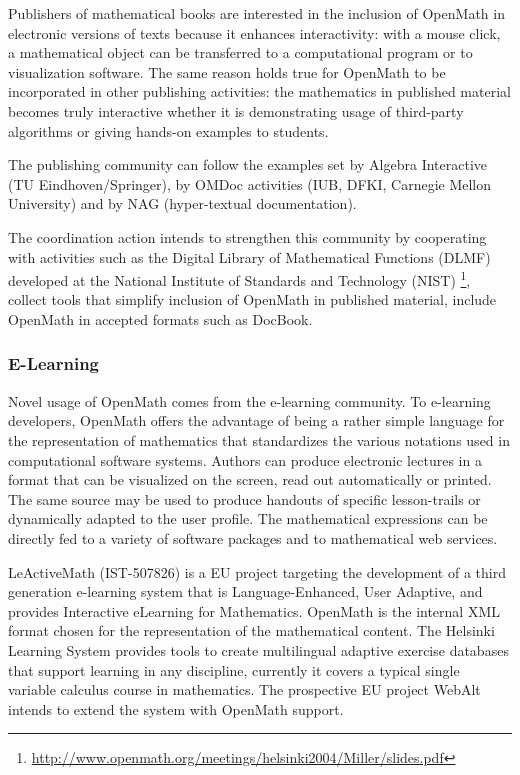 \documentclass{euproposal}
\begin{document}
Publishers of mathematical books are interested in the inclusion of
OpenMath in electronic versions of texts because it enhances
interactivity: with a mouse click, a mathematical object can be
transferred to a computational program or to visualization software.
The same reason holds true for OpenMath to be incorporated in other
publishing activities: the mathematics in published material becomes
truly interactive whether it is demonstrating usage of third-party
algorithms or giving hands-on examples to students.

The publishing community can follow the examples set by Algebra Interactive (TU
Eindhoven/Springer), by OMDoc activities (IUB, DFKI, Carnegie Mellon University) and by
NAG (hyper-textual documentation).

The coordination action intends to strengthen this community by cooperating with
activities such as the Digital Library of Mathematical Functions (DLMF) developed at the
National Institute of Standards and Technology (NIST)
\footnote{\url{http://www.openmath.org/meetings/helsinki2004/Miller/slides.pdf}}, collect
tools that simplify inclusion of OpenMath in published material, include OpenMath in
accepted formats such as DocBook.

\subsubsection{E-Learning}\label{sec:e-learn}
Novel usage of OpenMath comes from the e-learning community. To
e-learning developers, OpenMath offers the advantage of being a rather
simple language for the representation of mathematics that
standardizes the various notations used in computational software
systems. Authors can produce electronic lectures in a format that can
be visualized on the screen, read out automatically or printed. The
same source may be used to produce handouts of specific lesson-trails
or dynamically adapted to the user profile. The mathematical
expressions can be directly fed to a variety of software packages and
to mathematical web services.

LeActiveMath (IST-507826) is a EU project targeting the development of
a third generation e-learning system that is Language-Enhanced, User
Adaptive, and provides Interactive eLearning for Mathematics. OpenMath
is the internal XML format chosen for the representation of the
mathematical content.  The Helsinki Learning System provides tools to
create multilingual adaptive exercise databases that support learning
in any discipline, currently it covers a typical single variable
calculus course in mathematics. The prospective EU project WebAlt
intends to extend the system with OpenMath support.
\end{document}
